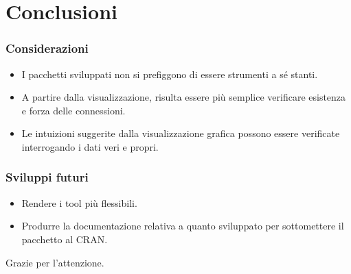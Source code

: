 \documentclass{beamer}
\begin{document}
\section{Conclusioni}

\begin{frame}
\frametitle{Considerazioni}
\begin{itemize}
\item I pacchetti sviluppati non si prefiggono di essere strumenti a sé stanti.
\item A partire dalla visualizzazione, risulta essere più semplice verificare esistenza e forza delle connessioni.
\item Le intuizioni suggerite dalla visualizzazione grafica possono essere verificate interrogando i dati veri e propri.
\end{itemize}
\end{frame}

\begin{frame}
\frametitle{Sviluppi futuri}
\begin{itemize}
\item Rendere i tool più flessibili.
\item Produrre la documentazione relativa a quanto sviluppato per sottomettere il pacchetto al CRAN.
\end{itemize}
\end{frame}

\begin{frame}[plain]
\begin{center}
\begin{huge}
Grazie per l'attenzione.
\end{huge}
\end{center}
\end{frame}
\end{document}
